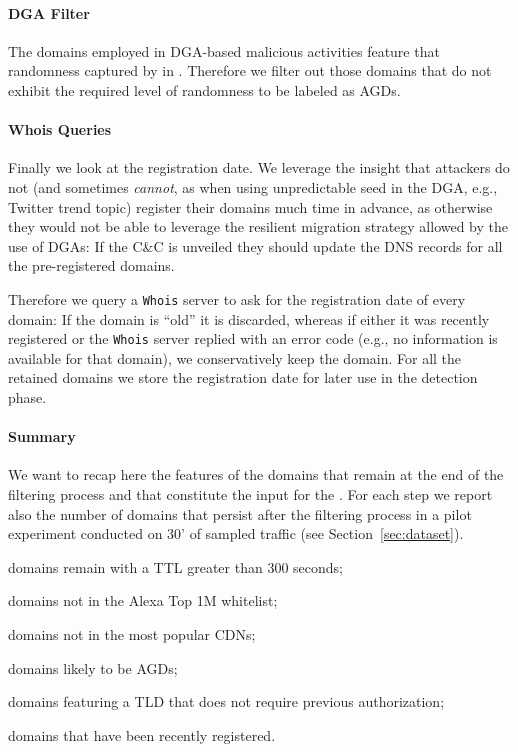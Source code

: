\paragraph{\phoenix DGA Filter} %
\label{par:phoenix_dga_filter}
The domains employed in DGA-based malicious activities feature that randomness captured
by \citet{schiavoni2013} in \phoenix. Therefore we filter out those domains that do
not exhibit the required level of randomness to be labeled as AGDs.

\paragraph{Whois Queries} %
\label{par:whois_queries}
Finally we look at the registration date. We leverage the insight that attackers
do not (and sometimes \emph{cannot}, as when using unpredictable seed in the DGA, e.g., Twitter trend topic) register
their domains much time in advance, as otherwise they would
not be able to leverage the resilient migration strategy allowed by the use of DGAs:
If the C\&C is unveiled they should update the DNS records for all the
pre-registered domains.

Therefore we query a \texttt{Whois} server to ask for the registration date of every domain:
If the domain is ``old'' it is discarded, whereas if either it was recently registered or
the \texttt{Whois} server replied with an error code (e.g., no information is available for that domain), we conservatively keep the domain. For all the
retained domains we
store the registration date for later use in the detection phase.

\paragraph{Summary} %
\label{par:summary}
We want to recap here the features of the domains that remain at the end of the
filtering process and that constitute the input for the .
For each step we report also the number of domains that persist after the filtering
process in a pilot experiment conducted on 30' of sampled traffic (see Section~\ref{sec:dataset}).


\begin{description}[labelwidth=\widthof{20,000}, leftmargin=!, align=parright]
    \item[20,000] domains remain with a TTL greater than 300 seconds;
    \item[19,000] domains not in the Alexa Top 1M whitelist;
    \item[15,000] domains not in the most popular CDNs;
    \item[800] domains likely to be AGDs;
    \item[700] domains featuring a TLD that does not require previous authorization;
    \item[300] domains that have been recently registered.
\end{description}

